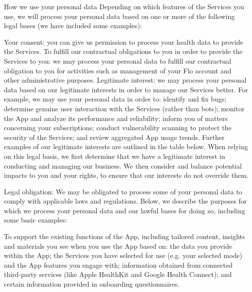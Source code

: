 How we use your personal data
Depending on which features of the Services you use, we will process your personal data based on one or more of the following legal bases (we have included some examples):

Your consent: you can give us permission to process your health data to provide the Services.
To fulfill our contractual obligations to you in order to provide the Services to you: we may process your personal data to fulfill our contractual obligation to you for activities such as management of your Flo account and other administrative purposes.
Legitimate interest: we may process your personal data based on our legitimate interests in order to manage our Services better. For example, we may use your personal data in order to: 
identify and fix bugs;
determine genuine user interaction with the Services (rather than bots); 
monitor the App and analyze its performance and reliability; 
inform you of matters concerning your subscriptions;
conduct vulnerability scanning to protect the security of the Services; and 
review aggregated App usage trends.
Further examples of our legitimate interests are outlined in the table below. When relying on this legal basis, we first determine that we have a legitimate interest in conducting and managing our business. We then consider and balance potential impacts to you and your rights, to ensure that our interests do not override them. 

Legal obligation: We may be obligated to process some of your personal data to comply with applicable laws and regulations.
Below, we describe the purposes for which we process your personal data and our lawful bases for doing so, including some basic examples:

To support the existing functions of the App, including tailored content, insights and materials you see when you use the App based on: the data you provide within the App; the Services you have selected for use (e.g. your selected mode) and the App features you engage with; information obtained from connected third-party services (like Apple HealthKit and Google Health Connect); and certain information provided in onboarding questionnaires.

